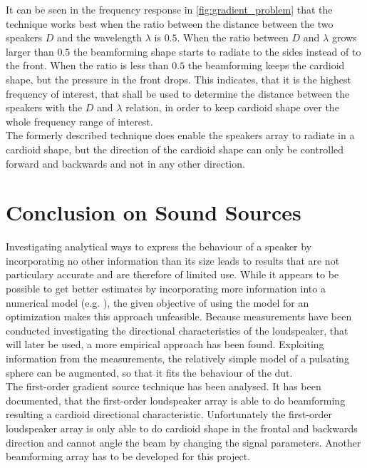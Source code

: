It can be seen in the frequency response in \autoref{fig:gradient_problem} that the technique works best when the ratio between the distance between the two speakers $D$ and the wavelength $\lambda$ is $0.5$. When the ratio between $D$ and $\lambda$ grows larger than $0.5$ the beamforming shape starts to radiate to the sides instead of to the front. When the ratio is less than $0.5$ the beamforming keeps the cardioid shape, but the pressure in the front drops. This indicates, that it is the highest frequency of interest, that shall be used to determine the distance between the speakers with the $D$ and $\lambda$ relation, in order to keep cardioid shape over the whole frequency range of interest.\\ 

The formerly described technique does enable the speakers array to radiate in a cardioid shape, but the direction of the cardioid shape can only be controlled forward and backwards and not in any other direction.

\section{Conclusion on Sound Sources}
Investigating analytical ways to express the behaviour of a speaker by incorporating no other information than its size leads to results that are not particulary accurate and are therefore of limited use. While it appears to be possible to get better estimates by incorporating more information into a numerical model (e.g. \citep{vanderkooy10}), the given objective of using the model for an optimization makes this approach unfeasible. Because measurements have been conducted investigating the directional characteristics of the loudspeaker, that will later be used, a more empirical approach has been found. Exploiting information from the measurements, the relatively simple model of a pulsating sphere can be augmented, so that it fits the behaviour of the \gls{dut}.\\
The first-order gradient source technique has been analysed. It has been documented, that the first-order loudspeaker array is able to do beamforming resulting a cardioid directional characteristic. Unfortunately the first-order loudspeaker array is only able to do cardioid shape in the frontal and backwards direction and cannot angle the beam by changing the signal parameters. Another beamforming array has to be developed for this project.